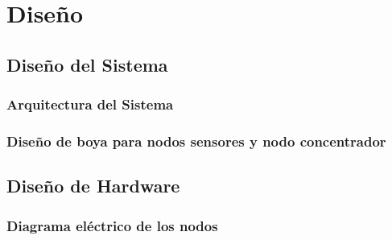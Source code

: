 \begin{comment}
\section{Diccionario de Datos}
\section{Diseño de Mock-up para la pagina web}
\section{Pagina principal}
\section{Diseño de la interfaz para la página Web}
\section{Integracion Final del Sistema}
\section{Escenario de pruebas}    
\end{comment}


\chapter{Diseño}

\section{Diseño del Sistema}
\subsection{Arquitectura del Sistema}
\subsection{Diseño de boya para nodos sensores y nodo concentrador}

\section{Diseño de Hardware}

\subsection{Diagrama eléctrico de los nodos}
\label{sec:diagrama_electrico}

